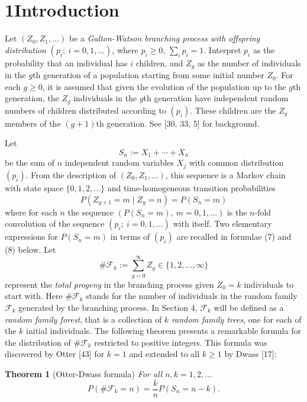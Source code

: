 \section*{1\quad Introduction}

Let $(Z_0,Z_1,\ldots)$ be a \emph{Galton-Watson branching process with offspring distribution} $(p_i;\ i=0,1,\ldots)$, where $p_i\ge 0$, $\sum_i p_i=1$. Interpret $p_i$ as the probability that an individual has $i$ children, and $Z_g$ as the number of individuals in the $g$th generation of a population starting from some initial number $Z_0$. For each $g\ge 0$, it is assumed that given the evolution of the population up to the $g$th generation, the $Z_g$ individuals in the $g$th generation have independent random numbers of children distributed according to $(p_i)$. These children are the $Z_g$ members of the $(g+1)$th generation. See [30, 33, 5] for background.

Let
\[
S_n:=X_1+\cdots+X_n \tag{1}
\]
be the sum of $n$ independent random variables $X_j$ with common distribution $(p_i)$. From the description of $(Z_0,Z_1,\ldots)$, this sequence is a Markov chain with state space $\{0,1,2,\ldots\}$ and time-homogeneous transition probabilities
\[
P(Z_{g+1}=m\mid Z_g=n)=P(S_n=m) \tag{2}
\]
where for each $n$ the sequence $(P(S_n=m),\ m=0,1,\ldots)$ is the $n$-fold convolution of the sequence $(p_i;\ i=0,1,\ldots)$ with itself. Two elementary expressions for $P(S_n=m)$ in terms of $(p_i)$ are recalled in formulae (7) and (8) below. Let
\[
\#\mathcal{F}_k:=\sum_{g=0}^{\infty} Z_g\in\{1,2,\ldots,\infty\} \tag{3}
\]
represent the \emph{total progeny} in the branching process given $Z_0=k$ individuals to start with. Here $\#\mathcal{F}_k$ stands for the number of individuals in the random family $\mathcal{F}_k$ generated by the branching process. In Section 4, $\mathcal{F}_k$ will be defined as a \emph{random family forest}, that is a collection of $k$ \emph{random family trees}, one for each of the $k$ initial individuals. The following theorem presents a remarkable formula for the distribution of $\#\mathcal{F}_k$ restricted to positive integers. This formula was discovered by Otter [43] for $k=1$ and extended to all $k\ge 1$ by Dwass [17]:

\textbf{Theorem 1} (Otter-Dwass formula) \emph{For all $n,k=1,2,\ldots$}
\[
P(\#\mathcal{F}_k=n)=\frac{k}{n}P(S_n=n-k). \tag{4}
\]

